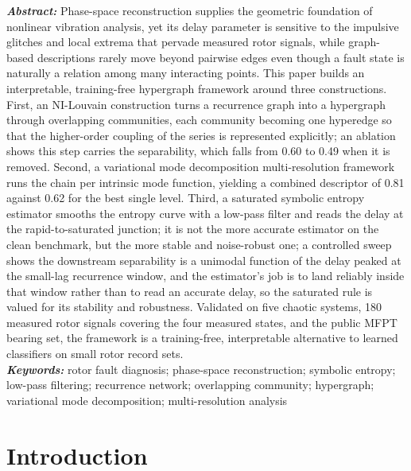 \documentclass[10pt,a4paper,twocolumn]{article}
\begin{document}
\noindent\textbf{\textit{Abstract:}} Phase-space reconstruction supplies the geometric foundation of nonlinear vibration analysis, yet its delay parameter is sensitive to the impulsive glitches and local extrema that pervade measured rotor signals, while graph-based descriptions rarely move beyond pairwise edges even though a fault state is naturally a relation among many interacting points. This paper builds an interpretable, training-free hypergraph framework around three constructions. First, an NI-Louvain construction turns a recurrence graph into a hypergraph through overlapping communities, each community becoming one hyperedge so that the higher-order coupling of the series is represented explicitly; an ablation shows this step carries the separability, which falls from 0.60 to 0.49 when it is removed. Second, a variational mode decomposition multi-resolution framework runs the chain per intrinsic mode function, yielding a combined descriptor of 0.81 against 0.62 for the best single level. Third, a saturated symbolic entropy estimator smooths the entropy curve with a low-pass filter and reads the delay at the rapid-to-saturated junction; it is not the more accurate estimator on the clean benchmark, but the more stable and noise-robust one; a controlled sweep shows the downstream separability is a unimodal function of the delay peaked at the small-lag recurrence window, and the estimator's job is to land reliably inside that window rather than to read an accurate delay, so the saturated rule is valued for its stability and robustness. Validated on five chaotic systems, 180 measured rotor signals covering the four measured states, and the public MFPT bearing set, the framework is a training-free, interpretable alternative to learned classifiers on small rotor record sets.\\[0.4em]
\noindent\textbf{\textit{Keywords:}} rotor fault diagnosis; phase-space reconstruction; symbolic entropy; low-pass filtering; recurrence network; overlapping community; hypergraph; variational mode decomposition; multi-resolution analysis

\section{Introduction}
\label{sec:intro}
\end{document}
